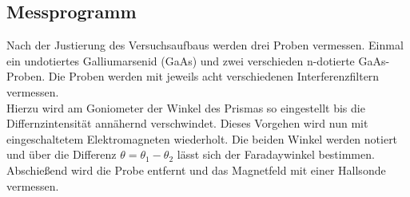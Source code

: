 \subsection{Messprogramm}
Nach der Justierung des Versuchsaufbaus werden drei Proben vermessen. Einmal ein undotiertes
Galliumarsenid (GaAs) und zwei verschieden n-dotierte GaAs-Proben. Die Proben werden mit jeweils
acht verschiedenen Interferenzfiltern vermessen.\\
Hierzu wird am Goniometer der Winkel des Prismas so eingestellt bis die Differnzintensität annähernd
verschwindet. Dieses Vorgehen wird nun mit eingeschaltetem Elektromagneten wiederholt.
Die beiden Winkel werden notiert und über die Differenz $\theta=\theta_1-\theta_2$ lässt sich der Faradaywinkel bestimmen.\\
Abschießend wird die Probe entfernt und das Magnetfeld mit einer Hallsonde vermessen.
